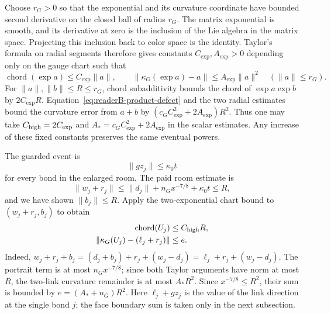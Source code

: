Choose $r_G>0$ so that the exponential and its curvature coordinate
have bounded second derivative on the closed ball of radius $r_G$.
The matrix exponential is smooth, and its derivative at zero is the
inclusion of the Lie algebra in the matrix space. Projecting this
inclusion back to color space is the identity. Taylor's formula
on radial segments therefore gives constants $C_{\exp},A_{\exp}>0$
depending only on the gauge chart such that
\[
 \operatorname{chord}(\exp a)\le C_{\exp}\|a\|,
 \qquad \|\kappa_G(\exp a)-a\|\le A_{\exp}\|a\|^2
 \quad (\|a\|\le r_G).
\]
For $\|a\|,\|b\|\le R\le r_G$, chord subadditivity bounds the chord of
$\exp a\exp b$ by $2C_{\exp}R$. Equation~\eqref{eq:readerB-product-defect}
and the two radial estimates bound the curvature error from $a+b$ by
$(c_G C_{\exp}^2+2A_{\exp})R^2$. Thus one may take
$C_{\rm high}=2C_{\exp}$ and $A_*=c_G C_{\exp}^2+2A_{\exp}$ in the
scalar estimates. Any increase of these fixed constants preserves
the same eventual powers.

The guarded event is
\[
 \|g z_j\|\leq\kappa_0t
\]
for every bond in the enlarged room. The paid room estimate is
\[
 \|w_j+r_j\|\leq \|d_j\|+n_Gx^{-7/8}+\kappa_0t\leq R,
\]
and we have shown $\|b_j\|\le R$. Apply the two-exponential chart
bound to $(w_j+r_j,b_j)$ to obtain
\begin{align}
 \operatorname{chord}(U_j)&\leq C_{\rm high}R,\label{eq:readerB-bondchord}\\
 \|\kappa_G(U_j)-(\ell_j+r_j)\|&\leq e.
 \label{eq:readerB-bondcurv}
\end{align}
Indeed, $w_j+r_j+b_j=(d_j+b_j)+r_j+(w_j-d_j)=\ell_j+r_j+(w_j-d_j)$.
The portrait term is at most $n_Gx^{-7/8}$; since both Taylor arguments
have norm at most $R$, the two-link curvature remainder is at most $A_*R^2$. Since $x^{-7/8}\leq R^2$, their sum is
bounded by $e=(A_*+n_G)R^2$. Here $\ell_j+gz_j$ is the value of the link direction at the single bond
$j$; the face boundary sum is taken only in the next subsection.

